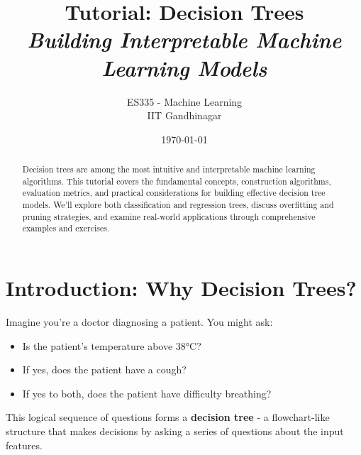 \documentclass{article}
\title{\textbf{Tutorial: Decision Trees} \\ \textit{Building Interpretable Machine Learning Models}}
\author{ES335 - Machine Learning \\ IIT Gandhinagar}
\date{\today}
\newcounter{example}
\newcounter{exercise}
\begin{document}
\maketitle

\begin{abstract}
Decision trees are among the most intuitive and interpretable machine learning algorithms. This tutorial covers the fundamental concepts, construction algorithms, evaluation metrics, and practical considerations for building effective decision tree models. We'll explore both classification and regression trees, discuss overfitting and pruning strategies, and examine real-world applications through comprehensive examples and exercises.
\end{abstract}

\tableofcontents
\newpage

\section{Introduction: Why Decision Trees?}

Imagine you're a doctor diagnosing a patient. You might ask:
\begin{itemize}
    \item Is the patient's temperature above 38°C?
    \item If yes, does the patient have a cough?
    \item If yes to both, does the patient have difficulty breathing?
\end{itemize}

This logical sequence of questions forms a \textbf{decision tree} - a flowchart-like structure that makes decisions by asking a series of questions about the input features.

\begin{center}
\end{center}
\end{document}

